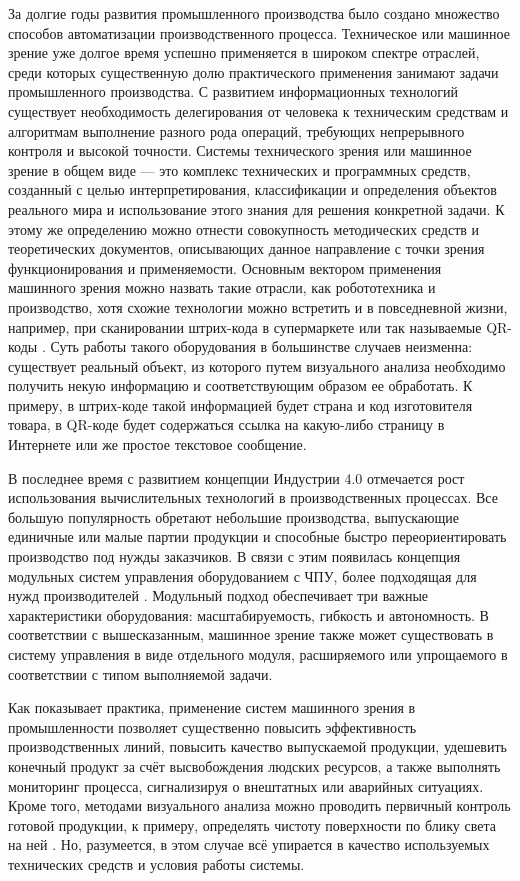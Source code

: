 
{\actuality} За долгие годы развития промышленного производства было создано множество способов автоматизации производственного процесса. Техническое или машинное зрение уже долгое время успешно применяется в широком спектре отраслей, среди которых существенную долю практического применения занимают задачи промышленного производства. С развитием информационных технологий существует необходимость делегирования от человека к техническим средствам и алгоритмам выполнение разного рода операций, требующих непрерывного контроля и высокой точности. Системы технического зрения или машинное зрение в общем виде --- это комплекс технических и программных средств, созданный с целью интерпретирования, классификации и определения объектов реального мира и использование этого знания для решения конкретной задачи. К этому же определению можно отнести совокупность методических средств и теоретических документов, описывающих данное направление с точки зрения функционирования и применяемости. Основным вектором применения машинного зрения можно назвать такие отрасли, как робототехника и производство, хотя схожие технологии можно встретить и в повседневной жизни, например, при сканировании штрих-кода в супермаркете или так называемые QR-коды \cite{Hung2020}. Суть работы такого оборудования в большинстве случаев неизменна: существует реальный объект, из которого путем визуального анализа необходимо получить некую информацию и соответствующим образом ее обработать. К примеру, в штрих-коде такой информацией будет страна и код изготовителя товара, в QR-коде будет содержаться ссылка на какую-либо страницу в Интернете или же простое текстовое сообщение.

В последнее время с развитием концепции Индустрии 4.0 \cite{Hermann2015, Moore2019, Schwab2017} отмечается рост использования вычислительных технологий в производственных процессах. Все большую популярность обретают небольшие производства, выпускающие единичные или малые партии продукции и способные быстро переориентировать производство под нужды заказчиков. В связи с этим появилась концепция модульных систем управления оборудованием с ЧПУ, более подходящая для нужд производителей \cite{Utin, Morales2010}. Модульный подход обеспечивает три важные характеристики оборудования: масштабируемость, гибкость и автономность. В соответствии с вышесказанным, машинное зрение также может существовать в систему управления в виде отдельного модуля, расширяемого или упрощаемого в соответствии с типом выполняемой задачи.

Как показывает практика, применение систем машинного зрения в промышленности позволяет существенно повысить эффективность производственных линий, повысить качество выпускаемой продукции, удешевить конечный продукт за счёт высвобождения людских ресурсов, а также выполнять мониторинг процесса, сигнализируя о внештатных или аварийных ситуациях. Кроме того, методами визуального анализа можно проводить первичный контроль готовой продукции, к примеру, определять чистоту поверхности по блику света на ней \cite{Allan2019}. Но, разумеется, в этом случае всё упирается в качество используемых технических средств и условия работы системы.

